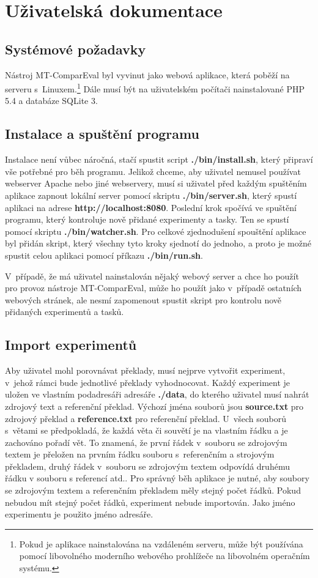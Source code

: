 \chapter{Uživatelská dokumentace}
\label{chap:users}

\section{Systémové požadavky}
Nástroj \mbox{MT-ComparEval} byl vyvinut jako webová aplikace,
  která poběží na serveru s~Linuxem.\footnote{
    Pokud je aplikace nainstalována na vzdáleném serveru, může být používána pomocí libovolného moderního webového prohlížeče na libovolném operačním systému.
  }
Dále musí být na uživatelském počítači nainstalované PHP 5.4 a databáze SQLite 3.

\section{Instalace a spuštění programu}
Instalace není vůbec náročná,
  stačí spustit script \textbf{./bin/install.sh},
  který připraví vše potřebné pro běh programu. 
Jelikož chceme,
  aby uživatel nemusel používat webserver Apache nebo jiné webservery,
  musí si uživatel před každým spuštěním aplikace zapnout lokální server pomocí skriptu \textbf{./bin/server.sh},
  který spustí aplikaci na adrese \textbf{http://localhost:8080}.
Poslední krok spočívá ve spuštění programu,
  který kontroluje nově přidané experimenty a tasky.
Ten se spustí pomocí skriptu \textbf{./bin/watcher.sh}.
Pro celkové zjednodušení spouštění aplikace byl přidán skript,
  který všechny tyto kroky sjednotí do jednoho,
  a proto je možné spustit celou aplikaci pomocí příkazu \textbf{./bin/run.sh}.

V~případě, že má uživatel nainstalován nějaký webový server
  a chce ho použít pro provoz nástroje \mbox{MT-ComparEval},
  může ho použít jako v~případě ostatních webových stránek,
  ale nesmí zapomenout spustit skript pro kontrolu nově přidaných experimentů a tasků.

\section{Import experimentů}
Aby uživatel mohl porovnávat překlady,
  musí nejprve vytvořit experiment,
  v~jehož rámci bude jednotlivé překlady vyhodnocovat.
Každý experiment je uložen ve vlastním podadresáři adresáře \textbf{./data},
  do kterého uživatel musí nahrát zdrojový text a referenční překlad.
Výchozí jména souborů jsou \textbf{source.txt} pro zdrojový překlad
  a \textbf{reference.txt} pro referenční překlad.
U~všech souborů s~větami se předpokladá,
  že každá věta či souvětí je na vlastním řádku
  a je zachováno pořadí vět.
To znamená, že první řádek v~souboru se zdrojovým textem je přeložen na prvním řádku souboru s~referenčním a strojovým překladem,
  druhý řádek v~souboru se zdrojovým textem odpovídá druhému řádku v souboru s referencí atd..
Pro správný běh aplikace je nutné, aby soubory se zdrojovým textem a referenčním překladem měly stejný počet řádků.
Pokud nebudou mít stejný počet řádků, experiment nebude importován.
Jako jméno experimentu je použito jméno adresáře.

